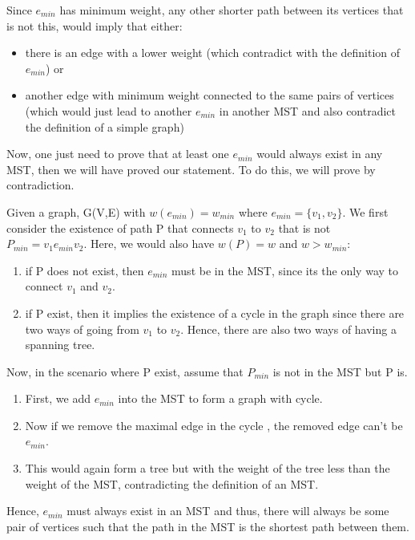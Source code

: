 \documentclass[nobib]{tufte-handout}
\begin{document}
\begin{enumerate}
    Since $e_{min}$ has minimum weight, any other shorter path between its vertices that is not this, would imply that either:
    \begin{itemize}
        \item there is an edge with a lower weight (which contradict with the definition of $e_{min}$) or
        \item another edge with minimum weight connected to the same pairs of vertices (which would just lead to another $e_{min}$ in another MST and also contradict the definition of a simple graph)
    \end{itemize}
    Now, one just need to prove that at least one $e_{min}$ would always exist in any MST, then we will have proved our statement. To do this, we will prove by contradiction.
    
    Given a graph, G(V,E) with $w(e_{min}) = w_{min}$ where $e_{min} =\{v_1,v_2\}$. We first consider the existence of path P that connects $v_1$ to $v_2$ that is not $P_{min}=v_1 e_{min} v_2$. Here, we would also have $w(P) = w$ and $w > w_{min}$: 
    \begin{enumerate}
        \item if P does not exist, then $e_{min}$ must be in the MST, since its the only way to connect $v_1 $ and $ v_2$.
        \item if P exist, then it implies the existence of a cycle in the graph since there are two ways of going from $v_1$ to $v_2$. Hence, there are also two ways of having a spanning tree.
    \end{enumerate}
    
    Now, in the scenario where P exist, assume that $P_{min}$ is not in the MST but P is. 
    \begin{enumerate}    
        \item First, we add $e_{min}$ into the MST to form a graph with cycle. 
        \item Now if we remove the maximal edge in the cycle , the removed edge can't be $e_{min}$. 
        \item This would again form a tree but with the weight of the tree less than the weight of the MST, contradicting the definition of an MST. 
    \end{enumerate}
    Hence, $e_{min}$ must always exist in an MST and thus, there will always be some pair of vertices such that the path in the MST is the shortest path between them.
    
\end{enumerate}
\newpage
\end{document}
